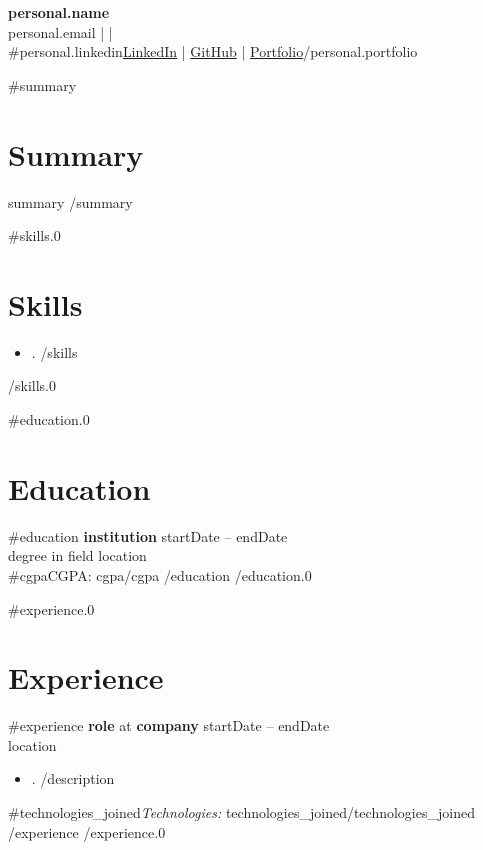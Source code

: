 \documentclass[11pt,a4paper]{article}
\begin{document}
\begin{center}
    {\LARGE\bfseries {{personal.name}}}\\[6pt]
    {{personal.email}} \quad |  \quad | \\
    {{#personal.linkedin}}\href{ {{personal.linkedin}} }{LinkedIn} \quad | \href{ {{personal.github}} }{GitHub} \quad | \href{ {{personal.portfolio}} }{Portfolio}{{/personal.portfolio}}
\end{center}

{{#summary}}
\section{Summary}
 {{summary}}
{{/summary}}

{{#skills.0}}
\section{Skills}
\begin{itemize}[leftmargin=*,nosep]
 {{#skills}}
    \item {{.}}
 {{/skills}}
\end{itemize}
{{/skills.0}}

{{#education.0}}
\section{Education}
 {{#education}}
\textbf{ {{institution}} } \hfill {{startDate}} -- {{endDate}}\\
 {{degree}} in {{field}} \hfill {{location}}\\
 {{#cgpa}}CGPA: {{cgpa}}{{/cgpa}}
 {{/education}}
{{/education.0}}

{{#experience.0}}
\section{Experience}
 {{#experience}}
\textbf{ {{role}} } at \textbf{ {{company}} } \hfill {{startDate}} -- {{endDate}}\\
 {{location}}
\begin{itemize}[leftmargin=*,nosep]
 {{#description}}
    \item {{.}}
 {{/description}}
\end{itemize}
 {{#technologies_joined}}\textit{Technologies:} {{technologies_joined}}{{/technologies_joined}}
 {{/experience}}
{{/experience.0}}
\end{document}
